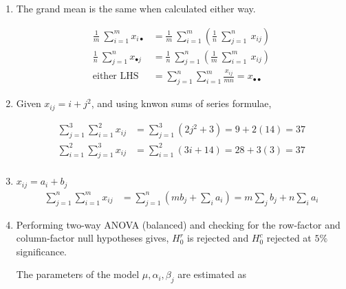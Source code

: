 \begin{enumerate}
\begin{table}[H]
		\bigskip
	\end{table}
	
	\item The grand mean is the same when calculated either way.
	
	\begin{align}
		\frac{1}{m}\ \sum\limits_{i = 1}^{m} x_{i\bullet} &= \frac{1}{m}\ \sum\limits_{i = 1}^{m} \left( \frac{1}{n}\ \sum\limits_{j = 1}^{n}\ x_{ij} \right) \nonumber \\
		\frac{1}{n}\ \sum\limits_{j = 1}^{n} x_{\bullet j} &= \frac{1}{n}\ \sum\limits_{j = 1}^{n} \left( \frac{1}{m}\ \sum\limits_{i = 1}^{m}\ x_{ij} \right) \nonumber \\
		\text{either LHS } &= \sum\limits_{j = 1}^{n} \sum\limits_{i = 1}^{m} \frac{x_{ij}}{mn} = x_{\bullet \bullet}
	\end{align}

	\item Given $ x_{ij} = i + j^2 $, and using knwon sums of series formulae,

		\begin{align}
			\sum\limits_{j = 1}^{3} \sum\limits_{i = 1}^{2} x_{ij} &= \sum\limits_{j = 1}^{3} (2j^2 + 3) = 9 + 2(14) = 37 \nonumber \\
			\sum\limits_{i = 1}^{2} \sum\limits_{j = 1}^{3} x_{ij} &= \sum\limits_{i = 1}^{2} (3i + 14) = 28 + 3(3) = 37 \nonumber \\
		\end{align}
	
	\item $ x_{ij} = a_i + b_j $\\
	
	\begin{align}
		\sum\limits_{j = 1}^{n} \sum\limits_{i = 1}^{m} x_{ij} &= \sum\limits_{j = 1}^{n} (m b_j + \sum_i a_i) = m \sum_j b_j + n \sum_i a_i 
	\end{align}

	\item Performing two-way ANOVA (balanced) and checking for the row-factor and column-factor null hypotheses gives,
	$ H_0^r $ is rejected and $ H_0^c $ rejected at $ 5\% $ significance.

	The parameters of the model $ \mu, \alpha_i, \beta_j $ are estimated as
	

\end{enumerate}
